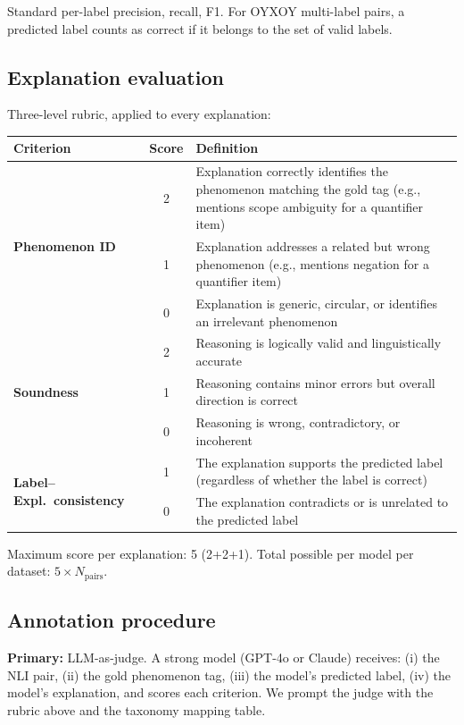 \documentclass[11pt,a4paper]{article}
\begin{document}
Standard per-label precision, recall, F1. For OYXOY multi-label pairs, a predicted label counts as correct if it belongs to the set of valid labels.

\subsection{Explanation evaluation}

Three-level rubric, applied to every explanation:

\begin{table}[h!]
\centering\small
\begin{tabularx}{\textwidth}{l c X}
\toprule
\textbf{Criterion} & \textbf{Score} & \textbf{Definition} \\
\midrule
\multirow{3}{*}{\textbf{Phenomenon ID}} & 2 & Explanation correctly identifies the phenomenon matching the gold tag (e.g., mentions scope ambiguity for a quantifier item) \\
& 1 & Explanation addresses a related but wrong phenomenon (e.g., mentions negation for a quantifier item) \\
& 0 & Explanation is generic, circular, or identifies an irrelevant phenomenon \\
\midrule
\multirow{3}{*}{\textbf{Soundness}} & 2 & Reasoning is logically valid and linguistically accurate \\
& 1 & Reasoning contains minor errors but overall direction is correct \\
& 0 & Reasoning is wrong, contradictory, or incoherent \\
\midrule
\multirow{2}{*}{\textbf{Label--Expl.\ consistency}} & 1 & The explanation supports the predicted label (regardless of whether the label is correct) \\
& 0 & The explanation contradicts or is unrelated to the predicted label \\
\bottomrule
\end{tabularx}
\end{table}

Maximum score per explanation: 5 (2+2+1). Total possible per model per dataset: $5 \times N_{\text{pairs}}$.

\subsection{Annotation procedure}

\textbf{Primary:} LLM-as-judge. A strong model (GPT-4o or Claude) receives: (i) the NLI pair, (ii) the gold phenomenon tag, (iii) the model's predicted label, (iv) the model's explanation, and scores each criterion. We prompt the judge with the rubric above and the taxonomy mapping table.
\end{document}
